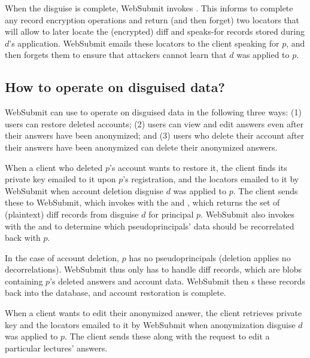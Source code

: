 When the disguise is complete, WebSubmit invokes . This informs \sys to complete any
record encryption operations and return (and then forget) two locators  that will allow \sys
to later locate the (encrypted) diff and speaks-for records stored during $d$'s application.
%
WebSubmit emails these locators to the client speaking for $p$, and then forgets them to ensure that
attackers cannot learn that $d$ was applied to $p$.

\subsection{How to operate on disguised data?}
\label{s:op-disg}

WebSubmit can use \sys to operate on disguised data in the following three ways: (1) users can
restore deleted accounts; (2) users can view and edit answers even after their answers have been
anonymized; and (3) users who delete their account after their answers have been anonymized can
delete their anonymized answers.

When a client who deleted $p$'s account wants to restore it, the client finds its private key
 emailed to it upon $p$'s registration, and the locators  emailed to it by WebSubmit when account deletion disguise $d$ was applied to $p$. 
The client sends these to WebSubmit, which invokes  with the  and , which returns the set of (plaintext) diff records from disguise $d$ for principal $p$. 
WebSubmit also invokes  with the  and  to determine which
pseudoprincipals' data should be recorrelated back with $p$.

In the case of account deletion, $p$ has no pseudoprincipals (deletion applies no decorrelations).
WebSubmit thus only has to handle diff records, which are blobs containing $p$'s deleted answers and
account data.  WebSubmit then s these records back into the database, and account
restoration is complete. 

When a client wants to edit their anonymized answer, the client retrieves private key
 and the locators  emailed to it by WebSubmit when anonymization disguise $d$ was
applied to $p$. The client sends these along with the request to edit a particular lectures'
answers. 


